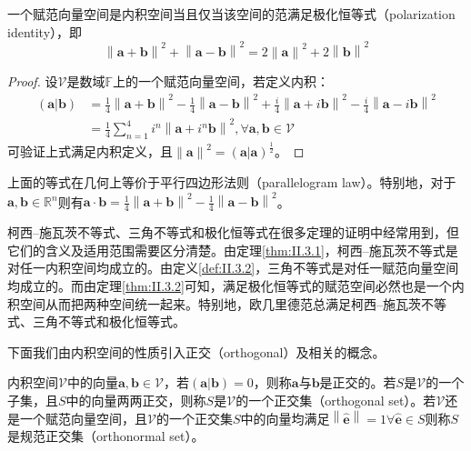 \documentclass[main.tex]{subfiles}
\begin{document}
\begin{theorem}\label{thm:II.3.2}
一个赋范向量空间是内积空间当且仅当该空间的范满足极化恒等式（polarization identity），即
\[\left\|\mathbf{a}+\mathbf{b}\right\|^2+\left\|\mathbf{a}-\mathbf{b}\right\|^2=2\left\|\mathbf{a}\right\|^2+2\left\|\mathbf{b}\right\|^2\]
\end{theorem}
\begin{proof}
设$\mathcal{V}$是数域$\mathbb{F}$上的一个赋范向量空间，若定义内积：
\begin{align*}
\left(\mathbf{a}|\mathbf{b}\right)&=\frac{1}{4}\left\|\mathbf{a}+\mathbf{b}\right\|^2-\frac{1}{4}\left\|\mathbf{a}-\mathbf{b}\right\|^2+\frac{i}{4}\left\|\mathbf{a}+i\mathbf{b}\right\|^2-\frac{i}{4}\left\|\mathbf{a}-i\mathbf{b}\right\|^2\\
&=\frac{1}{4}\sum_{n=1}^4i^n\left\|\mathbf{a}+i^n\mathbf{b}\right\|^2,\forall\mathbf{a},\mathbf{b}\in\mathcal{V}
\end{align*}
可验证上式满足内积定义，且$\left\|\mathbf{a}\right\|^2=\left(\mathbf{a}|\mathbf{a}\right)^{\frac{1}{2}}$。
\end{proof}

上面的等式在几何上等价于平行四边形法则（parallelogram law）。特别地，对于$\mathbf{a},\mathbf{b}\in\mathbb{R}^n$则有$\mathbf{a}\cdot\mathbf{b}=\frac{1}{4}\left\|\mathbf{a}+\mathbf{b}\right\|^2-\frac{1}{4}\left\|\mathbf{a}-\mathbf{b}\right\|^2$。

柯西--施瓦茨不等式、三角不等式和极化恒等式在很多定理的证明中经常用到，但它们的含义及适用范围需要区分清楚。由定理\ref{thm:II.3.1}，柯西--施瓦茨不等式是对任一内积空间均成立的。由定义\ref{def:II.3.2}，三角不等式是对任一赋范向量空间均成立的。而由定理\ref{thm:II.3.2}可知，满足极化恒等式的赋范空间必然也是一个内积空间从而把两种空间统一起来。特别地，欧几里德范总满足柯西--施瓦茨不等式、三角不等式和极化恒等式。

下面我们由内积空间的性质引入正交（orthogonal）及相关的概念。

\begin{definition}[正交]\label{def:II.3.3}
内积空间$\mathcal{V}$中的向量$\mathbf{a},\mathbf{b}\in\mathcal{V}$，若$\left(\mathbf{a}|\mathbf{b}\right)=0$，则称$\mathbf{a}$与$\mathbf{b}$是正交的。若$S$是$\mathcal{V}$的一个子集，且$S$中的向量两两正交，则称$S$是$\mathcal{V}$的一个正交集（orthogonal set）。若$\mathcal{V}$还是一个赋范向量空间，且$\mathcal{V}$的一个正交集$S$中的向量均满足$\left\|\hat{\mathbf{e}}\right\|=1\forall\hat{\mathbf{e}}\in S$则称$S$是规范正交集（orthonormal set）。
\end{definition}
\end{document}

